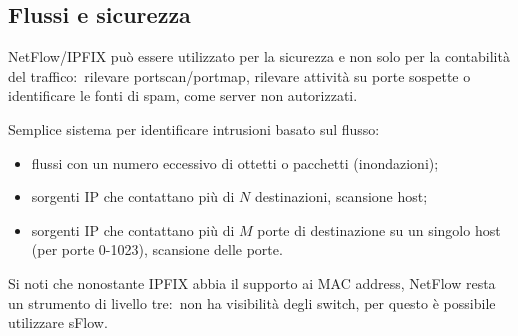 \subsection{Flussi e sicurezza}

NetFlow/IPFIX può essere utilizzato per la sicurezza e non solo per la contabilità del traffico:\ rilevare portscan/portmap, rilevare attività su porte sospette o identificare le fonti di spam, come server non autorizzati.

Semplice sistema per identificare intrusioni basato sul flusso:
\begin{itemize}
    \item flussi con un numero eccessivo di ottetti o pacchetti (inondazioni);
    \item sorgenti IP che contattano più di $N$ destinazioni, scansione host;
    \item sorgenti IP che contattano più di $M$ porte di destinazione su un singolo host (per porte 0-1023), scansione delle porte.
\end{itemize}

\noindent Si noti che nonostante IPFIX abbia il supporto ai MAC address, NetFlow resta un strumento di livello tre:\ non ha visibilità degli switch, per questo è possibile utilizzare sFlow.

